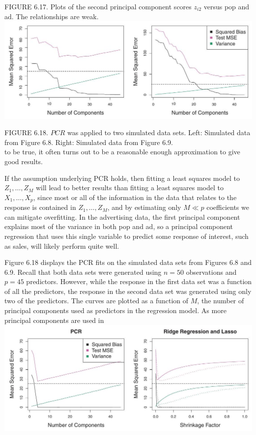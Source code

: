 \documentclass[10pt]{article}
\begin{document}
FIGURE 6.17. Plots of the second principal component scores $z_{i 2}$ versus pop and ad. The relationships are weak.\\
\includegraphics[max width=\textwidth, center]{2025_05_05_efe77898333945044de4g-249}

FIGURE 6.18. $P C R$ was applied to two simulated data sets. Left: Simulated data from Figure 6.8. Right: Simulated data from Figure 6.9.\\
to be true, it often turns out to be a reasonable enough approximation to give good results.

If the assumption underlying PCR holds, then fitting a least squares model to $Z_{1}, \ldots, Z_{M}$ will lead to better results than fitting a least squares model to $X_{1}, \ldots, X_{p}$, since most or all of the information in the data that relates to the response is contained in $Z_{1}, \ldots, Z_{M}$, and by estimating only $M \ll p$ coefficients we can mitigate overfitting. In the advertising data, the first principal component explains most of the variance in both pop and ad, so a principal component regression that uses this single variable to predict some response of interest, such as sales, will likely perform quite well.

Figure 6.18 displays the PCR fits on the simulated data sets from Figures 6.8 and 6.9. Recall that both data sets were generated using $n=50$ observations and $p=45$ predictors. However, while the response in the first data set was a function of all the predictors, the response in the second data set was generated using only two of the predictors. The curves are plotted as a function of $M$, the number of principal components used as predictors in the regression model. As more principal components are used in\\
\includegraphics[max width=\textwidth, center]{2025_05_05_efe77898333945044de4g-250}
\end{document}

